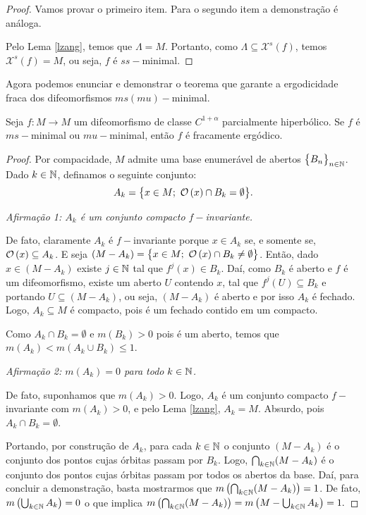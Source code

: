 \begin{proof} Vamos provar o primeiro item. Para o segundo item a demonstração é análoga.

Pelo Lema \ref{lzang}, temos que $\Lambda=M$. Portanto, como $\Lambda\subseteq \mathcal{X}^s(f)$, temos $\mathcal{X}^s(f)=M$, ou seja, $f$ é $ss-$minimal.
\end{proof}

Agora podemos enunciar e demonstrar o teorema que garante a ergodicidade fraca dos difeomorfismos $ms(mu)-$minimal.

\begin{teorema}\label{ergofraca} Seja $f:M\to M$ um difeomorfismo de classe $C^{1+\alpha}$ parcialmente hiperbólico. Se $f$ é $ms-$minimal ou $mu-$minimal, então $f$ é fracamente ergódico.
\end{teorema}

\begin{proof} Por compacidade, $M$ admite uma base enumerável de abertos $\big\{B_n\big\}_{n\in\mathbb{N}}$. Dado $k\in \mathbb{N}$, definamos o seguinte conjunto: $$A_k=\big\{x\in M;\ \mathcal{O}\left(x\right)\cap B_k=\emptyset\big\}.$$ 

\textit{Afirmação 1: $A_k$ é um conjunto compacto $f-$invariante.}

De fato, claramente $A_k$ é $f-$invariante porque $x\in A_k$ se, e somente se, $\mathcal{O}\left(x\right)\subseteq A_k$. E seja $(M-A_k)=\big\{x\in M;\ \mathcal{O}\left(x\right)\cap B_k\neq\emptyset\big\}$. Então, dado $x\in (M-A_k)$ existe $j\in\mathbb{N}$ tal que $f^j(x)\in B_k$. Daí, como $B_k$ é aberto e $f$ é um difeomorfismo, existe um aberto $U$ contendo $x$, tal que $f^j(U)\subseteq B_k$ e portando $U\subseteq (M-A_k)$, ou seja, $(M-A_k)$ é aberto e por isso $A_k$ é fechado. Logo, $A_k\subseteq M$ é compacto, pois é um fechado contido em um compacto. 

Como $A_k\cap B_k=\emptyset$ e $m(B_k)>0$ pois é um aberto, temos que $m(A_k)<m(A_k\cup B_k)\leq1$. 

\textit{Afirmação 2: $m(A_k)=0$ para todo $k\in\mathbb{N}$.}

De fato, suponhamos que $m(A_k)>0$. Logo, $A_k$ é um conjunto compacto $f-$invariante com $m(A_k)>0$, e pelo Lema \ref{lzang}, $A_k=M$. Absurdo, pois $A_k\cap B_k=\emptyset$.

Portando, por construção de $A_k$, para cada $k\in\mathbb{N}$ o conjunto $(M-A_k)$ é o conjunto dos pontos cujas órbitas passam por $B_k$. Logo, $\bigcap_{k\in\mathbb{N}}(M-A_k)$ é o conjunto dos pontos cujas órbitas passam por todos os abertos da base. Daí, para concluir a demonstração, basta mostrarmos que $m\left(\bigcap_{k\in\mathbb{N}}(M-A_k)\right)=1$. De fato, $m\left(\bigcup_{k\in\mathbb{N}}A_k\right)=0$ o que implica $m\left(\bigcap_{k\in\mathbb{N}}(M-A_k)\right)=m\left(M-\bigcup_{k\in\mathbb{N}}A_k\right)=1.$
\end{proof}

%